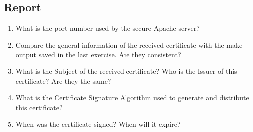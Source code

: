 \documentclass[10pt,a4paper]{article}
\numberwithin{equation}{section}
\numberwithin{figure}{section}
\numberwithin{table}{section}
\begin{document}
	\subsection*{Report}
	\begin{enumerate}
		\setlength{\itemindent}{0pt}
		\item What is the port number used by the secure Apache server?
		\item Compare the general information of the received certificate with the make output saved in the last exercise. Are they consistent?
		\item What is the Subject of the received certificate? Who is the Issuer of this certificate? Are they the same?
		\item What is the Certificate Signature Algorithm used to generate and distribute this certificate?
		\item When was the certificate signed? When will it expire?
	\end{enumerate}
	
\end{document}
